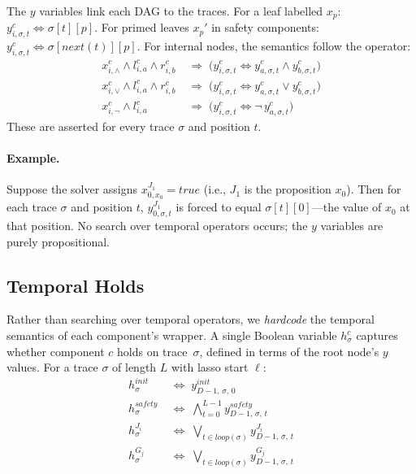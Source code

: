 The $y$ variables link each DAG to the traces.
For a leaf labelled $x_p$:
$y^c_{i,\sigma,t} \Leftrightarrow \sigma[t][p]$.
For primed leaves $x_p'$ in safety components:
$y^c_{i,\sigma,t} \Leftrightarrow \sigma[\mathit{next}(t)][p]$.
For internal nodes, the semantics follow the operator:
\begin{align*}
x^c_{i,\land} \land l^c_{i,a} \land r^c_{i,b} &\;\Rightarrow\;
  \bigl(y^c_{i,\sigma,t} \Leftrightarrow
  y^c_{a,\sigma,t} \land y^c_{b,\sigma,t}\bigr) \\
x^c_{i,\lor} \land l^c_{i,a} \land r^c_{i,b} &\;\Rightarrow\;
  \bigl(y^c_{i,\sigma,t} \Leftrightarrow
  y^c_{a,\sigma,t} \lor y^c_{b,\sigma,t}\bigr) \\
x^c_{i,\lnot} \land l^c_{i,a} &\;\Rightarrow\;
  \bigl(y^c_{i,\sigma,t} \Leftrightarrow
  \lnot\, y^c_{a,\sigma,t}\bigr)
\end{align*}
These are asserted for every trace $\sigma$ and position $t$.

\paragraph{Example.}
Suppose the solver assigns $x^{J_1}_{0,x_0} = \mathit{true}$
(i.e., $J_1$ is the proposition $x_0$).
Then for each trace $\sigma$ and position $t$,
$y^{J_1}_{0,\sigma,t}$ is forced to equal $\sigma[t][0]$---the
value of $x_0$ at that position.
No search over temporal operators occurs; the $y$ variables are
purely propositional.

\subsection{Temporal Holds}\label{sec:temporal}

Rather than searching over temporal operators, we \emph{hardcode}
the temporal semantics of each component's wrapper.
A single Boolean variable $h^c_\sigma$ captures whether component
$c$ holds on trace~$\sigma$, defined in terms of the root node's
$y$ values.
For a trace $\sigma$ of length $L$ with lasso start $\ell$:
\begin{align}
  h^{\mathit{init}}_\sigma &\;\Leftrightarrow\;
    y^{\mathit{init}}_{D-1,\,\sigma,\,0}
    \label{eq:init}\\[2pt]
  h^{\mathit{safety}}_\sigma &\;\Leftrightarrow\;
    \textstyle\bigwedge_{t=0}^{L-1}
    y^{\mathit{safety}}_{D-1,\,\sigma,\,t}
    \label{eq:safety}\\[2pt]
  h^{J_i}_\sigma &\;\Leftrightarrow\;
    \textstyle\bigvee_{t \in \mathit{loop}(\sigma)}
    y^{J_i}_{D-1,\,\sigma,\,t}
    \label{eq:justice}\\[2pt]
  h^{G_j}_\sigma &\;\Leftrightarrow\;
    \textstyle\bigvee_{t \in \mathit{loop}(\sigma)}
    y^{G_j}_{D-1,\,\sigma,\,t}
    \label{eq:guarantee}
\end{align}

